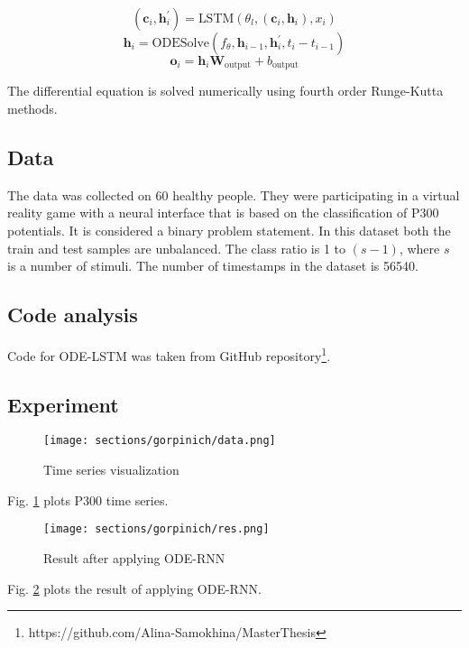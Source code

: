 \documentclass[../../main.tex]{subfiles}
\begin{document}
$$(\mathbf{c}_{i}, \mathbf{h}_{i}^\prime) = \text{LSTM}(\theta_l, (\mathbf{c}_{i}, \mathbf{h}_{i}), x_i)$$
$$\mathbf{h}_i = \text{ODESolve}(f_\theta, \mathbf{h}_{i-1}, \mathbf{h}_i^\prime, t_i - t_{i-1})$$
$$\mathbf{o}_i = \mathbf{h}_i\mathbf{W}_{\text{output}} + b_{\text{output}}$$

The differential equation is solved numerically using fourth order Runge-Kutta methods.

\subsection{Data}

The data was collected on 60 healthy people.  They were participating in a virtual reality game with a neural interface that is based on the classification of P300 potentials. It is considered a binary problem statement. In this dataset both the train and test samples are unbalanced. The class ratio is 1 to $(s-1)$, where $s$ is a number of stimuli. The number of timestamps in the dataset is 56540.

\subsection{Code analysis}

Code for ODE-LSTM was taken from GitHub repository\footnote{https://github.com/Alina-Samokhina/MasterThesis}.

\subsection{Experiment}

\begin{figure}[h!]
\centering
\texttt{[image: sections/gorpinich/data.png]}
\caption{Time series visualization}
\label{fig:data}
\end{figure}

Fig. \ref{fig:data} plots P300 time series.

\begin{figure}[h!]
\centering
\texttt{[image: sections/gorpinich/res.png]}
\caption{Result after applying ODE-RNN}
\label{fig:res}
\end{figure}

Fig. \ref{fig:res} plots the result of applying ODE-RNN.
\end{document}
